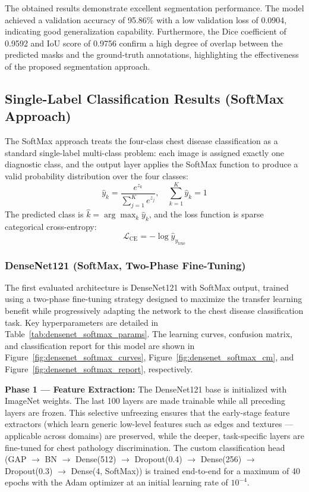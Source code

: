The obtained results demonstrate excellent segmentation performance. The model achieved a validation accuracy of 95.86\% with a low validation loss of 0.0904, indicating good generalization capability. Furthermore, the Dice coefficient of 0.9592 and IoU score of 0.9756 confirm a high degree of overlap between the predicted masks and the ground-truth annotations, highlighting the effectiveness of the proposed segmentation approach.

\subsection{Single-Label Classification Results (SoftMax Approach)}

The SoftMax approach treats the four-class chest disease classification as a standard single-label multi-class problem: each image is assigned exactly one diagnostic class, and the output layer applies the SoftMax function to produce a valid probability distribution over the four classes:
\begin{equation}
	\hat{y}_k = \frac{e^{z_k}}{\sum_{j=1}^K e^{z_j}}, \quad \sum_{k=1}^K \hat{y}_k = 1
\end{equation}
The predicted class is $\hat{k} = \arg\max_k \hat{y}_k$, and the loss function is sparse categorical cross-entropy:
\begin{equation}
	\mathcal{L}_{\text{CE}} = -\log \hat{y}_{y_{\text{true}}}
\end{equation}

\subsubsection{DenseNet121 (SoftMax, Two-Phase Fine-Tuning)}

The first evaluated architecture is DenseNet121 with SoftMax output, trained using a two-phase fine-tuning strategy designed to maximize the transfer learning benefit while progressively adapting the network to the chest disease classification task. Key hyperparameters are detailed in Table~\ref{tab:densenet_softmax_params}. The learning curves, confusion matrix, and classification report for this model are shown in Figure~\ref{fig:densenet_softmax_curves}, Figure~\ref{fig:densenet_softmax_cm}, and Figure~\ref{fig:densenet_softmax_report}, respectively.

\textbf{Phase 1 --- Feature Extraction:} The DenseNet121 base is initialized with ImageNet weights. The last 100 layers are made trainable while all preceding layers are frozen. This selective unfreezing ensures that the early-stage feature extractors (which learn generic low-level features such as edges and textures --- applicable across domains) are preserved, while the deeper, task-specific layers are fine-tuned for chest pathology discrimination. The custom classification head (GAP $\to$ BN $\to$ Dense(512) $\to$ Dropout(0.4) $\to$ Dense(256) $\to$ Dropout(0.3) $\to$ Dense(4, SoftMax)) is trained end-to-end for a maximum of 40 epochs with the Adam optimizer at an initial learning rate of $10^{-4}$.

